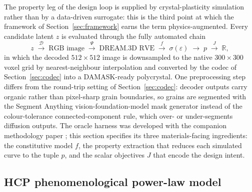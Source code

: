 \documentclass[preprint,12pt]{elsarticle}
\begin{document}
The property leg of the design loop is supplied by crystal-plasticity simulation rather than by a data-driven surrogate: this is the third point at which the framework of Section~\ref{sec:framework} earns the term physics-augmented. Every candidate latent $z$ is evaluated through the fully automated chain
\begin{equation}
  z \;\xrightarrow{\;\mathcal{D}\;}\; \text{RGB image} \;\xrightarrow{\;\Psi\;}\; \text{DREAM.3D RVE} \;\xrightarrow{\;f\;}\; \sigma(\varepsilon) \;\longrightarrow\; p \;\xrightarrow{\;J\;}\; \mathbb{R},
  \label{eq:oracle-chain}
\end{equation}
in which the decoded $512\times512$ image is downsampled to the native $300\times300$ voxel grid by nearest-neighbour interpolation and converted by the codec of Section~\ref{sec:codec} into a DAMASK-ready polycrystal. One preprocessing step differs from the round-trip setting of Section~\ref{sec:codec}: decoder outputs carry organic rather than pixel-sharp grain boundaries, so grains are segmented with the Segment Anything vision-foundation-model mask generator \cite{Kirillov-SAM-2023} instead of the colour-tolerance connected-component rule, which over- or under-segments diffusion outputs. The oracle harness was developed with the companion methodology paper {\color{red}\cite{CoPiLOT2026}}; this section specifies its three materials-facing ingredients: the constitutive model $f$, the property extraction that reduces each simulated curve to the tuple $p$, and the scalar objectives $J$ that encode the design intent.

\subsection{HCP phenomenological power-law model}
\label{sec:cp-model}
\end{document}
